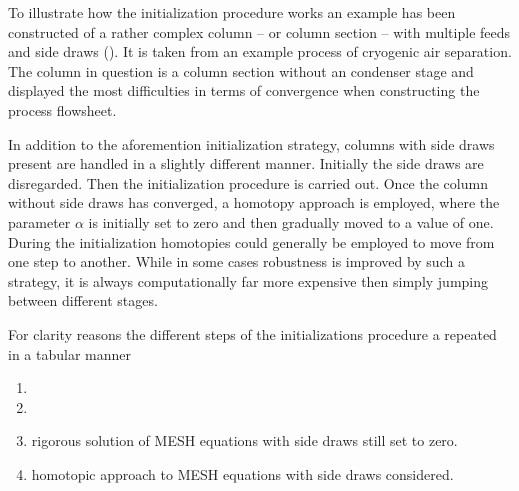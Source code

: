         To illustrate how the initialization procedure works an example has been constructed of
        a rather complex column -- or column section -- with multiple feeds and side draws ().
        It is taken from an example process of cryogenic air separation. The column in question
        is a column section without an condenser stage and displayed the most difficulties in terms
        of convergence when constructing the process flowsheet.

        In addition to the aforemention initialization strategy, columns with side draws present are handled
        in a slightly different manner. Initially the side draws are disregarded. Then the initialization procedure
        is carried out. Once the column without side draws has converged, a homotopy approach
        is employed, where the parameter $\alpha$ is initially set to zero and then gradually moved to a value
        of one.  During the initialization homotopies could
        generally be employed to move from one step to another. While in some cases robustness is improved by
        such a strategy, it is always computationally far more expensive then simply jumping between different
        stages.

        For clarity reasons the different steps of the initializations procedure a repeated in a tabular manner

        \begin{enumerate}
            \item {}
            \item {}
            \item rigorous solution of MESH equations with side draws still set to zero.
            \item homotopic approach to MESH equations with side draws considered.
        \end{enumerate}

